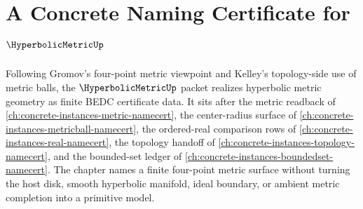 \chapter{A Concrete Naming Certificate for $\HyperbolicMetricUp$}
\label{ch:concrete-instances-hyperbolic-metric-namecert}

Following Gromov's four-point metric viewpoint and Kelley's topology-side use of metric balls, the $\HyperbolicMetricUp$ packet realizes hyperbolic metric geometry as finite BEDC certificate data. It sits after the metric readback of \autoref{ch:concrete-instances-metric-namecert}, the center-radius surface of \autoref{ch:concrete-instances-metricball-namecert}, the ordered-real comparison rows of \autoref{ch:concrete-instances-real-namecert}, the topology handoff of \autoref{ch:concrete-instances-topology-namecert}, and the bounded-set ledger of \autoref{ch:concrete-instances-boundedset-namecert}. The chapter names a finite four-point metric surface without turning the host disk, smooth hyperbolic manifold, ideal boundary, or ambient metric completion into a primitive model.

